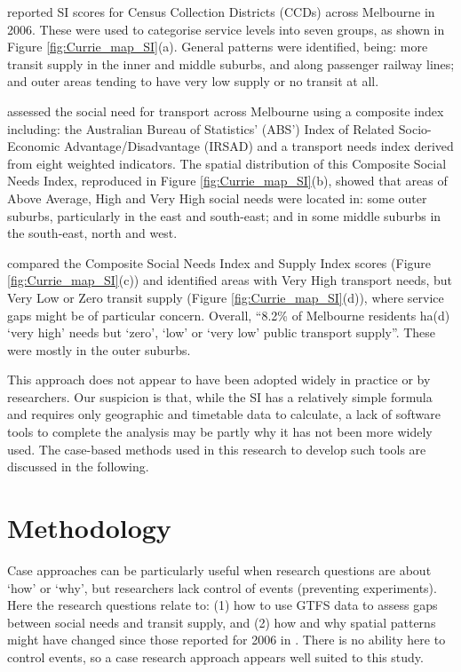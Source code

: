 \documentclass[preprint, 3p,
authoryear]{elsarticle} %
\begin{document}
\citet{currie2010identifying} reported SI scores for Census Collection
Districts (CCDs) across Melbourne in 2006. These were used to categorise
service levels into seven groups, as shown in Figure
\ref{fig:Currie_map_SI}(a). General patterns were identified, being:
more transit supply in the inner and middle suburbs, and along passenger
railway lines; and outer areas tending to have very low supply or no
transit at all.

\citet{currie2010identifying} assessed the social need for transport
across Melbourne using a composite index including: the Australian
Bureau of Statistics' (ABS') Index of Related Socio-Economic
Advantage/Disadvantage (IRSAD) and a transport needs index derived from
eight weighted indicators. The spatial distribution of this Composite
Social Needs Index, reproduced in Figure \ref{fig:Currie_map_SI}(b),
showed that areas of Above Average, High and Very High social needs were
located in: some outer suburbs, particularly in the east and south-east;
and in some middle suburbs in the south-east, north and west.

\citet{currie2010identifying} compared the Composite Social Needs Index
and Supply Index scores (Figure \ref{fig:Currie_map_SI}(c)) and
identified areas with Very High transport needs, but Very Low or Zero
transit supply (Figure \ref{fig:Currie_map_SI}(d)), where service gaps
might be of particular concern. Overall, ``8.2\% of Melbourne residents
ha(d) `very high' needs but `zero', `low' or `very low' public transport
supply''\citep{currie2010identifying}. These were mostly in the outer
suburbs.

This approach does not appear to have been adopted widely in practice or
by researchers. Our suspicion is that, while the SI has a relatively
simple formula and requires only geographic and timetable data to
calculate, a lack of software tools to complete the analysis may be
partly why it has not been more widely used. The case-based methods used
in this research to develop such tools are discussed in the following.

\section{Methodology}\label{methodology}

Case approaches can be particularly useful when research questions are
about `how' or `why', but researchers lack control of events (preventing
experiments)\citep{Yin2009aa}. Here the research questions relate to:
(1) how to use GTFS data to assess gaps between social needs and transit
supply, and (2) how and why spatial patterns might have changed since
those reported for 2006 in \citet{currie2010identifying}. There is no
ability here to control events, so a case research approach appears well
suited to this study.
\end{document}

